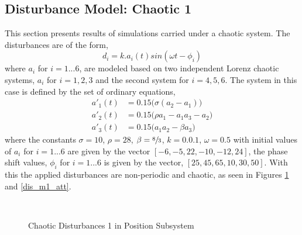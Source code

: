 \documentclass[letterpaper%
, twoside%
, 12pt%
,memoire%
, english%
,creativecommons,hyperref%
]{thETS}
\theoremstyle{newThmStyle}
\begin{document}
\subsection{Disturbance Model: Chaotic 1}
This section presents results of simulations carried under a chaotic system. The disturbances are of the form,
\begin{equation}
d_i = k.a_i(t)sin(\omega t-\phi_i)
\label{eq:dist_1}
\end{equation}
where $a_i$ for $i=1...6$, are modeled based on two independent Lorenz chaotic systems, $a_i$ for $i=1,2,3$ and the second system for $i=4,5,6$. The system in this case is defined by the set of ordinary equations, 
\begin{subequations}
\begin{align}
a'_1(t) &= 0.15\big(\sigma(a_2-a_1)\big)\\
a'_2(t) &= 0.15\big(\rho a_1 - a_1 a_3 - a_2\big)\\
a'_3(t) &= 0.15\big(a_1 a_2 - \beta a_3\big)
\end{align}
\end{subequations}
where the constants $\sigma=10$, $\rho=28$, $\beta=\sfrac{8}{3}$, $k=0.0.1$, $\omega=0.5$ with initial values of $a_i$ for $i=1...6$ are given by the vector $[-6,-5,22,-10,-12,24]$, the phase shift values, $\phi_i$ for $i=1...6$ is given by the vector, $[25,45,65,10,30,50]$. With this the applied disturbances are non-periodic and chaotic, as seen in Figures \ref{dis_m1_pos} and \ref{dis_m1_att}.

\begin{figure}[H]
\centering
{}
\\ \parbox{0.75\textwidth}{\caption{Chaotic Disturbances 1 in Position Subsystem}\label{dis_m1_pos}}
\end{figure}
\end{document}
